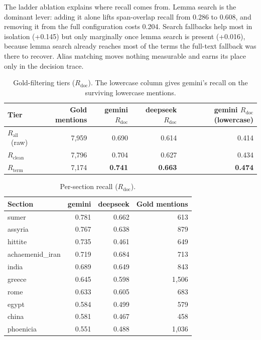 \documentclass[sigconf,review]{acmart}
\newcommand{\Rdoc}{\ensuremath{R_{\mathrm{doc}}}}
\newcommand{\Rall}{\ensuremath{R_{\mathrm{all}}}}
\newcommand{\Rclean}{\ensuremath{R_{\mathrm{clean}}}}
\newcommand{\Rterm}{\ensuremath{R_{\mathrm{term}}}}
\begin{document}
The ladder ablation explains where recall comes from. Lemma search is the
dominant lever: adding it alone lifts span-overlap recall from 0.286 to 0.608,
and removing it from the full configuration costs 0.204. Search fallbacks help
most in isolation (+0.145) but only marginally once lemma search is present
(+0.016), because lemma search already reaches most of the terms the
full-text fallback was there to recover. Alias matching moves nothing
measurable and earns its place only in the decision trace.

\begin{table}
  \caption{Gold-filtering tiers (\Rdoc). The lowercase column gives gemini's
  recall on the surviving lowercase mentions.}
  \label{tab:tiers}
  \begin{tabular}{lrrrr}
    \toprule
    Tier & Gold mentions & gemini \Rdoc & deepseek \Rdoc & gemini \Rdoc\ (lowercase) \\
    \midrule
    \Rall\ (raw) & 7,959 & 0.690 & 0.614 & 0.414 \\
    \Rclean      & 7,796 & 0.704 & 0.627 & 0.434 \\
    \Rterm       & 7,174 & \textbf{0.741} & \textbf{0.663} & \textbf{0.474} \\
    \bottomrule
  \end{tabular}
\end{table}

\begin{table}
  \caption{Per-section recall (\Rdoc).}
  \label{tab:persection}
  \begin{tabular}{lrrr}
    \toprule
    Section & gemini & deepseek & Gold mentions \\
    \midrule
    sumer            & 0.781 & 0.662 & 613 \\
    assyria          & 0.767 & 0.638 & 879 \\
    hittite          & 0.735 & 0.461 & 649 \\
    achaemenid\_iran & 0.719 & 0.684 & 713 \\
    india            & 0.689 & 0.649 & 843 \\
    greece           & 0.645 & 0.598 & 1,506 \\
    rome             & 0.633 & 0.605 & 683 \\
    egypt            & 0.584 & 0.499 & 579 \\
    china            & 0.581 & 0.467 & 458 \\
    phoenicia        & 0.551 & 0.488 & 1,036 \\
    \bottomrule
  \end{tabular}
\end{table}
\end{document}
